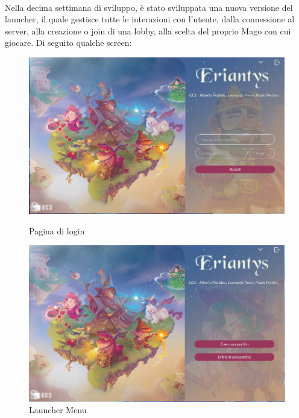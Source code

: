\documentclass[a4paper, 12pt]{article}
\begin{document}
	\paragraph{}
	Nella decima settimana di sviluppo, è stato sviluppata una nuova versione del launcher, il quale gestisce tutte le interazioni con l'utente, dalla connessione al server, alla creazione o join di una lobby, alla scelta del proprio Mago con cui giocare. Di seguito qualche screen:
	\begin{figure}[!htb]
		\begin{minipage}{0.495\textwidth}
			\centering
			\includegraphics[width=\linewidth]{launcher_1.png}
			\caption{Pagina di login}
		\end{minipage}\hfill
		\begin{minipage}{0.495\textwidth}
			\centering
			\includegraphics[width=\linewidth]{launcher_2.png}
			\caption{Launcher Menu}
		\end{minipage}
	\end{figure}
\end{document}
